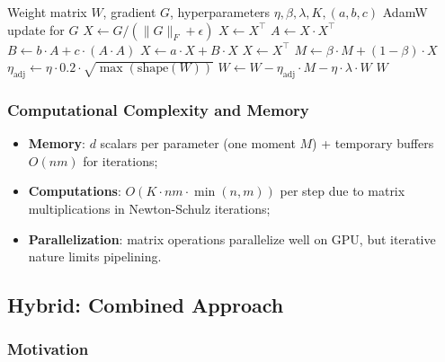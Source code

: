 \documentclass[a4paper,12pt]{article}
\begin{document}
\begin{algorithm}[H]
\caption{Muon: Update of a single weight matrix parameter}
\label{alg:muon}
\begin{algorithmic}[1]
\Require Weight matrix $W$, gradient $G$, hyperparameters $\eta, \beta, \lambda, K, (a,b,c)$
    \State \Return AdamW update for $G$ 
\EndIf
\State {}
\State $X \gets G / (\|G\|_F + \epsilon)$
    \State $X \gets X^\top$
\EndIf
\State {}
    \State $A \gets X \cdot X^\top$
    \State $B \gets b \cdot A + c \cdot (A \cdot A)$
    \State $X \gets a \cdot X + B \cdot X$
\EndFor
{}
    \State $X \gets X^\top$
\EndIf
\State {}
\State $M \gets \beta \cdot M + (1 - \beta) \cdot X$
\State $\eta_{\text{adj}} \gets \eta \cdot 0.2 \cdot \sqrt{\max(\text{shape}(W))}$
\State $W \gets W - \eta_{\text{adj}} \cdot M - \eta \cdot \lambda \cdot W$
\State \Return $W$
\end{algorithmic}
\end{algorithm}

\subsubsection{Computational Complexity and Memory}

\begin{itemize}
    \item \textbf{Memory}: $d$ scalars per parameter (one moment $M$) + temporary buffers $O(nm)$ for iterations;
    \item \textbf{Computations}: $O(K \cdot nm \cdot \min(n,m))$ per step due to matrix multiplications in Newton-Schulz iterations;
    \item \textbf{Parallelization}: matrix operations parallelize well on GPU, but iterative nature limits pipelining.
\end{itemize}

\subsection{Hybrid: Combined Approach}

\subsubsection{Motivation}
\end{document}
